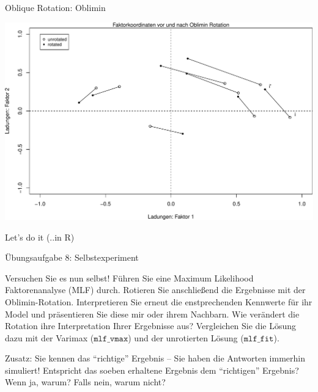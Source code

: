 \documentclass[
  ignorenonframetext,
]{beamer}
\newenvironment{Shaded}{\begin{snugshade}}{\end{snugshade}}
\newcommand{\AttributeTok}[1]{\textcolor[rgb]{0.77,0.63,0.00}{#1}}
\newcommand{\CommentTok}[1]{\textcolor[rgb]{0.56,0.35,0.01}{\textit{#1}}}
\newcommand{\DecValTok}[1]{\textcolor[rgb]{0.00,0.00,0.81}{#1}}
\newcommand{\FunctionTok}[1]{\textcolor[rgb]{0.00,0.00,0.00}{#1}}
\newcommand{\NormalTok}[1]{#1}
\newcommand{\OtherTok}[1]{\textcolor[rgb]{0.56,0.35,0.01}{#1}}
\newcommand{\SpecialCharTok}[1]{\textcolor[rgb]{0.00,0.00,0.00}{#1}}
\newcommand{\StringTok}[1]{\textcolor[rgb]{0.31,0.60,0.02}{#1}}
\begin{document}
\begin{frame}[fragile]{Oblique Rotation: Oblimin}
\begin{center}\includegraphics[width=0.7\linewidth]{06-EFA_files/figure-beamer/unnamed-chunk-9-1} \end{center}
\end{frame}

\begin{frame}[fragile]{Let's do it (..in R)}
\protect\hypertarget{lets-do-it-..in-r-1}{}
\begin{Shaded}
\end{Shaded}
\end{frame}

\begin{frame}{Übungsaufgabe 8: Selbstexperiment}
\protect\hypertarget{uxfcbungsaufgabe-8-selbstexperiment}{}
\begin{example}
Versuchen Sie es nun selbst! Führen Sie eine Maximum Likelihood Faktorenanalyse
(MLF) durch. Rotieren Sie anschließend die Ergebnisse mit der Oblimin-Rotation.
Interpretieren Sie erneut die enstprechenden Kennwerte für ihr Model und
präsentieren Sie diese mir oder ihrem Nachbarn. Wie verändert die Rotation ihre
Interpretation Ihrer Ergebnisse aus? Vergleichen Sie die Lösung dazu mit der
Varimax ($\texttt{mlf_vmax}$) und der unrotierten Lösung ($\texttt{mlf_fit}$).
\end{example}

Zusatz: Sie kennen das ``richtige'' Ergebnis -- Sie haben die Antworten
immerhin simuliert! Entspricht das soeben erhaltene Ergebnis dem
``richtigen'' Ergebnis? Wenn ja, warum? Falls nein, warum nicht?
\end{frame}
\end{document}
